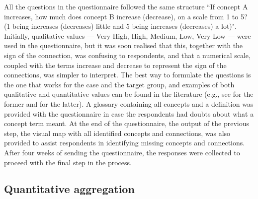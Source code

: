 All the questions in the questionnaire followed the same structure ``If concept A increases, how much does concept B increase (decrease), on a scale from 1 to 5? (1 being increases (decreases) little and 5 being increases (decreases) a lot)". Initially, qualitative values --- Very High, High, Medium, Low, Very Low --- were used in the questionnaire, but it was soon realised that this, together with the sign of the connection, was confusing to respondents, and that a numerical scale, coupled with the terms increase and decrease to represent the sign of the connections, was simpler to interpret. The best way to formulate the questions is the one that works for the case and the target group, and examples of both qualitative and quantitative values can be found in the literature (e.g., see \cite{morone2021using} for the former and \cite{olazabal2016use} for the latter). A glossary containing all concepts and a definition was provided with the questionnaire in case the respondents had doubts about what a concept term meant. At the end of the questionnaire, the output of the previous step, the visual map with all identified concepts and connections, was also provided to assist respondents in identifying missing concepts and connections. After four weeks of sending the questionnaire, the responses were collected to proceed with the final step in the process. 

\subsection{Quantitative aggregation}

